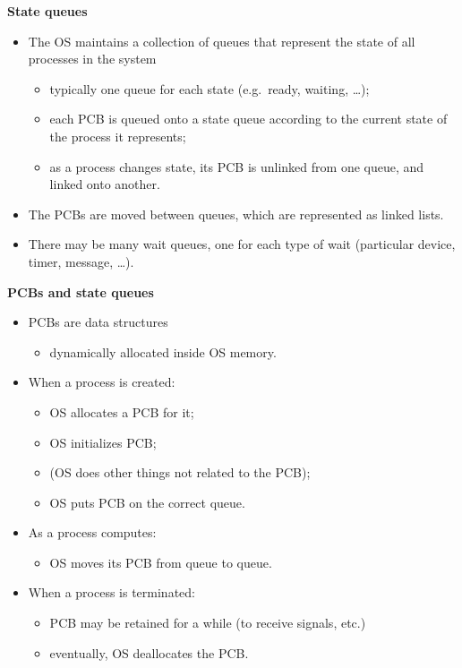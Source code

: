 \documentclass[11pt,a4paper]{article}
\begin{document}
\textbf{State queues}
\begin{itemize}
    \item The OS maintains a collection of queues that represent the state of all processes in
        the system
        \begin{itemize}
            \item typically one queue for each state (e.g.\ ready, waiting, \dots);
            \item each PCB is queued onto a state queue according to the current state of the
                process it represents;
            \item as a process changes state, its PCB is unlinked from one queue,
                and linked onto another.
        \end{itemize}
    \item The PCBs are moved between queues, which are represented as linked lists.
    \item There may be many wait queues, one for each type of wait
        (particular device, timer, message, \dots).
\end{itemize}

\textbf{PCBs and state queues}
\begin{itemize}
    \item PCBs are data structures
        \begin{itemize}
            \item dynamically allocated inside OS memory.
        \end{itemize}
    \item When a process is created:
        \begin{itemize}
            \item OS allocates a PCB for it;
            \item OS initializes PCB;\
            \item (OS does other things not related to the PCB);
            \item OS puts PCB on the correct queue.
        \end{itemize}
    \item As a process computes:
        \begin{itemize}
            \item OS moves its PCB from queue to queue.
        \end{itemize}
    \item When a process is terminated:
        \begin{itemize}
            \item PCB may be retained for a while (to receive signals, etc.)
            \item eventually, OS deallocates the PCB.\
        \end{itemize}
\end{itemize}
\end{document}
